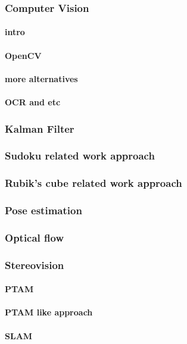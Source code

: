 \documentclass[../../main]{subfiles}
\begin{document}
\subsubsection{Computer Vision}
\paragraph{intro}
\paragraph{OpenCV}
\paragraph{more alternatives}
\paragraph{OCR and etc}

\subsubsection{Kalman Filter}

\subsubsection{Sudoku related work approach}
\subsubsection{Rubik's cube related work approach}

\subsubsection{Pose estimation}
\subsubsection{Optical flow}

\subsubsection{Stereovision}
\paragraph{PTAM}
\paragraph{PTAM like approach}
\paragraph{SLAM}
\end{document}
